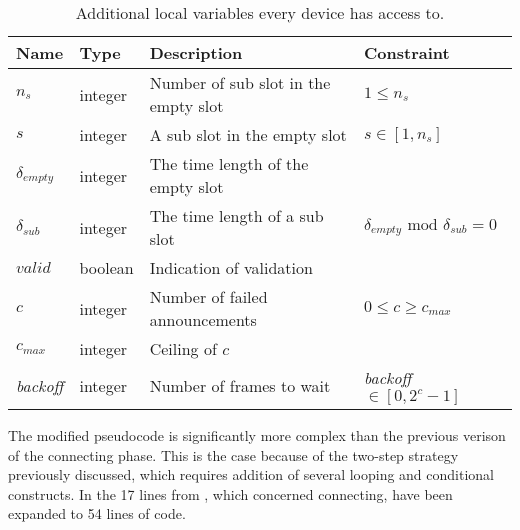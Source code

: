 \begin{table}[h]
    {\setlength{\extrarowheight}{1ex}%
    \begin{tabularx}{\textwidth}{l|l|X|l}
        \toprule
        Name                & Type      & Description & Constraint \\
        \midrule
        $n_s$               & integer   & Number of sub slot in the empty slot  & $1 \leq n_s$      \\
        $s$                 & integer   & A sub slot in the empty slot          & $s \in [1, n_s]$  \\
        $\delta_{empty}$    & integer   & The time length of the empty slot     \\
        $\delta_{sub}$      & integer   & The time length of a sub slot         & $\delta_{empty} \text{ mod } \delta_{sub} = 0$ \\
        $valid$             & boolean   & Indication of validation              \\
        $c$                 & integer   & Number of failed announcements        & $0 \leq c \geq c_{max}$ \\
        $c_{max}$           & integer   & Ceiling of $c$                        \\
        \emph{backoff}      & integer   & Number of frames to wait              & \emph{backoff}$ \in [0, 2^c-1]$ \\
        \bottomrule
    \end{tabularx}}
    \caption{Additional local variables every device has access to.}
    \label{tab:locals_wmulticonnect}
\end{table}

The modified pseudocode is significantly more complex than the previous verison of the connecting phase.
This is the case because of the two-step strategy previously discussed, which requires addition of several looping and conditional constructs.
In  the 17 lines from , which concerned connecting, have been expanded to 54 lines of code. 

